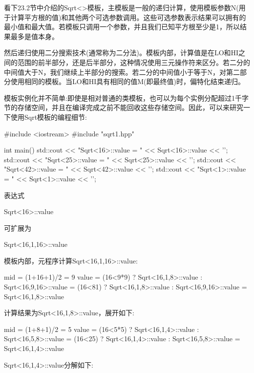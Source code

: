 
看下23.2节中介绍的Sqrt<>模板，主模板是一般的递归计算，使用模板参数N(用于计算平方根的值)和其他两个可选参数调用。这些可选参数表示结果可以拥有的最小值和最大值。若模板只调用一个参数，并且我们已知平方根至少是1，所以结果最多是值本身。

然后递归使用二分搜索技术(通常称为二分法)。模板内部，计算值是在LO和HI之间的范围的前半部分，还是后半部分，这种情况使用三元操作符来区分。若二分的中间值大于N，我们继续上半部分的搜索。若二分的中间值小于等于N，对第二部分使用相同的模板。当LO和HI具有相同的值M(即最终值)时，偏特化结束递归。

模板实例化并不简单:即使是相对普通的类模板，也可以为每个实例分配超过1千字节的存储空间，并且在编译完成之前不能回收这些存储空间。因此，可以来研究一下使用Sqrt模板的编程细节:

\begin{cpp}
#include <iostream>
#include "sqrt1.hpp"

int main()
{
	std::cout << "Sqrt<16>::value = " << Sqrt<16>::value << ’\n’;
	std::cout << "Sqrt<25>::value = " << Sqrt<25>::value << ’\n’;
	std::cout << "Sqrt<42>::value = " << Sqrt<42>::value << ’\n’;
	std::cout << "Sqrt<1>::value = " << Sqrt<1>::value << ’\n’;
}
\end{cpp}

表达式

\begin{cpp}
Sqrt<16>::value
\end{cpp}

可扩展为

\begin{cpp}
Sqrt<16,1,16>::value
\end{cpp}

模板内部，元程序计算Sqrt<16,1,16>::value:

\begin{cpp}
mid = (1+16+1)/2
	= 9
value = (16<9*9) ? Sqrt<16,1,8>::value
				: Sqrt<16,9,16>::value
	  = (16<81) ? Sqrt<16,1,8>::value
				: Sqrt<16,9,16>::value
	  = Sqrt<16,1,8>::value
\end{cpp}

计算结果为Sqrt<16,1,8>::value，展开如下:

\begin{cpp}
mid = (1+8+1)/2
	= 5
value = (16<5*5) ? Sqrt<16,1,4>::value
				: Sqrt<16,5,8>::value
	  = (16<25) ? Sqrt<16,1,4>::value
				: Sqrt<16,5,8>::value
	  = Sqrt<16,1,4>::value
\end{cpp}

Sqrt<16,1,4>::value分解如下:

